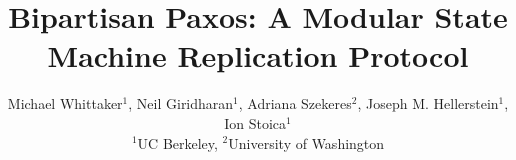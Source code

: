 \documentclass[letterpaper,twocolumn,10pt]{article}
\begin{document}
\date{}

\title{Bipartisan Paxos: A Modular State Machine Replication Protocol}

\author{%
  \rm
  Michael Whittaker$^1$,
  Neil Giridharan$^1$,
  Adriana Szekeres$^2$,
  Joseph M. Hellerstein$^1$,
  Ion Stoica$^1$\\
  $^1$UC Berkeley,
  $^2$University of Washington
}

\maketitle

{}
{}
{}
{}
{}
{}
{}
{}




\appendix
{}
\end{document}
